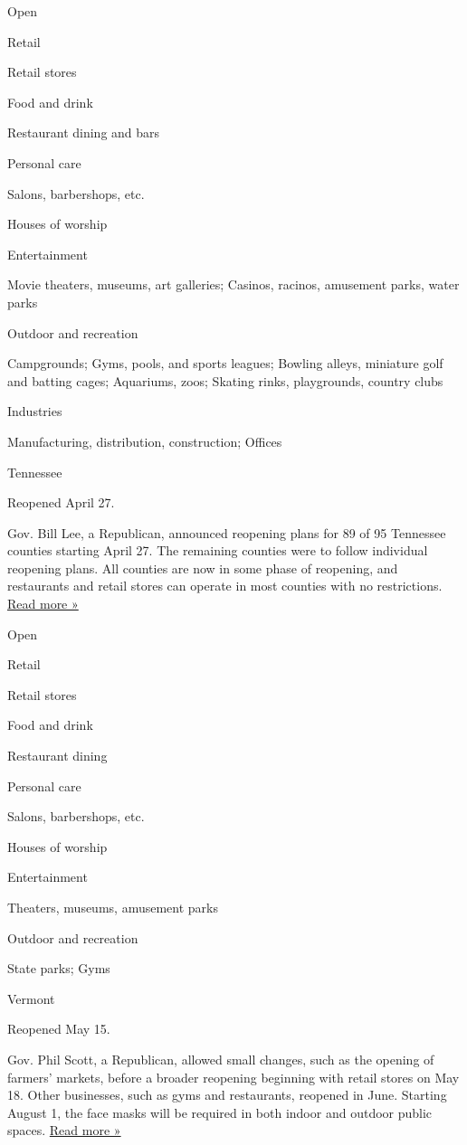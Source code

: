 Open

Retail

Retail stores

Food and drink

Restaurant dining and bars

Personal care

Salons, barbershops, etc.

Houses of worship

Entertainment

Movie theaters, museums, art galleries; Casinos, racinos, amusement
parks, water parks

Outdoor and recreation

Campgrounds; Gyms, pools, and sports leagues; Bowling alleys, miniature
golf and batting cages; Aquariums, zoos; Skating rinks, playgrounds,
country clubs

Industries

Manufacturing, distribution, construction; Offices

Tennessee

Reopened April 27.

Gov. Bill Lee, a Republican, announced reopening plans for 89 of 95
Tennessee counties starting April 27. The remaining counties were to
follow individual reopening plans. All counties are now in some phase of
reopening, and restaurants and retail stores can operate in most
counties with no restrictions.
\href{https://www.wsmv.com/news/tennessee-releases-new-guidelines-for-reopening-restaurants-retail-and-large-attractions/article_0f74cd22-9ad3-11ea-9f03-e3784e1e4029.html}{Read
more »}

Open

Retail

Retail stores

Food and drink

Restaurant dining

Personal care

Salons, barbershops, etc.

Houses of worship

Entertainment

Theaters, museums, amusement parks

Outdoor and recreation

State parks; Gyms

Vermont

Reopened May 15.

Gov. Phil Scott, a Republican, allowed small changes, such as the
opening of farmers' markets, before a broader reopening beginning with
retail stores on May 18. Other businesses, such as gyms and restaurants,
reopened in June. Starting August 1, the face masks will be required in
both indoor and outdoor public spaces.
\href{https://vtdigger.org/2020/07/24/scott-orders-mask-mandate/}{Read
more »}

